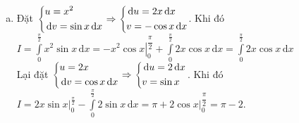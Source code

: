 \begin{bt}
{\begin{enumerate}[a.]
\begin{tabular}{l|ccc}
\end{tabular} Khi đó \\
$I= \displaystyle \int _1^0 \dfrac{u (-\mathrm{\,d}u)}{(1+u)^2}=\displaystyle \int\limits_0^1 \left( \dfrac{1}{u+1}-\dfrac{1}{(u+1)^2} \right) \mathrm{\,d}u = \left. \left( \ln \vert u+1 \vert - \dfrac{1}{u+1} \right) \right|_0^1 = \ln 2 -\dfrac{1}{2}$.
\item Đặt $\left\{\begin{aligned}&u=x^2\\& \mathrm{\,d}v=\sin x \mathrm{\,d}x\end{aligned}\right. \Rightarrow \left\{\begin{aligned}& \mathrm{\,d}u = 2x \mathrm{\,d}x\\& v = -\cos x \mathrm{\,d}x\end{aligned}\right.$. Khi đó\\
$I=\displaystyle \int \limits_0^{\tfrac{\pi}{2}} x^2 \sin x \mathrm{\,d}x = \left. -x^2\cos  x \right|_0^{\dfrac{\pi}{2}} + \displaystyle \int \limits_0^{\tfrac{\pi}{2}} 2x \cos x \mathrm{\,d}x= \displaystyle \int \limits_0^{\tfrac{\pi}{2}} 2x \cos  x \mathrm{\,d}x$\\
Lại đặt $\left\{\begin{aligned}&u=2x\\& \mathrm{\,d}v=\cos x \mathrm{\,d}x\end{aligned}\right. \Rightarrow \left\{\begin{aligned}&\mathrm{\,d}u=2\mathrm{\,d}x\\&v=\sin x\end{aligned}\right.$. Khi đó\\
$I= 2x \sin x \Big|_0^{\tfrac{\pi}{2}} -\displaystyle \int \limits_0^{\tfrac{\pi}{2}} 2\sin x \mathrm{\,d}x=\pi+2\cos x \Big|_0^{\dfrac{\pi}{2}}=\pi-2$.
\end{enumerate}
}
\end{bt}
